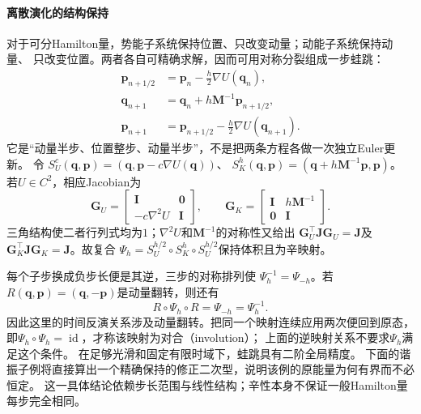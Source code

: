 \paragraph{离散演化的结构保持}
对于可分Hamilton量，势能子系统保持位置、只改变动量；动能子系统保持动量、
只改变位置。两者各自可精确求解，因而可用对称分裂组成一步蛙跳：
\begin{align}
  \bm p_{n+1/2}&=\bm p_n-\frac h2\nabla U(\bm q_n),
    \label{eq:dynamical-leapfrog-half-momentum}\\
  \bm q_{n+1}&=\bm q_n+h\bm M^{-1}\bm p_{n+1/2},
    \label{eq:dynamical-leapfrog-position}\\
  \bm p_{n+1}&=\bm p_{n+1/2}-\frac h2\nabla U(\bm q_{n+1}).
    \label{eq:dynamical-leapfrog-final-momentum}
\end{align}
它是“动量半步、位置整步、动量半步”，不是把两条方程各做一次独立Euler更新。
令
$S_U^c(\bm q,\bm p)=(\bm q,\bm p-c\nabla U(\bm q))$、
$S_K^h(\bm q,\bm p)=(\bm q+h\bm M^{-1}\bm p,\bm p)$。
若$U\in C^2$，相应Jacobian为
\[
  \bm G_U=\begin{bmatrix}\bm I&\bm0\\-c\nabla^2U&\bm I\end{bmatrix},
  \qquad
  \bm G_K=\begin{bmatrix}\bm I&h\bm M^{-1}\\\bm0&\bm I\end{bmatrix}.
\]
三角结构使二者行列式均为$1$；$\nabla^2U$和$\bm M^{-1}$的对称性又给出
$\bm G_U^\top\bm J\bm G_U=\bm J$及
$\bm G_K^\top\bm J\bm G_K=\bm J$。故复合
$\Psi_h=S_U^{h/2}\circ S_K^h\circ S_U^{h/2}$保持体积且为辛映射。

每个子步换成负步长便是其逆，三步的对称排列使
$\Psi_h^{-1}=\Psi_{-h}$。若$R(\bm q,\bm p)=(\bm q,-\bm p)$是动量翻转，则还有
\[
  R\circ\Psi_h\circ R=\Psi_{-h}=\Psi_h^{-1}.
\]
因此这里的时间反演关系涉及动量翻转。把同一个映射连续应用两次便回到原态，
即$\Psi_h\circ\Psi_h=\operatorname{id}$，才称该映射为对合（involution）；
上面的逆映射关系不要求$\Psi_h$满足这个条件。
在足够光滑和固定有限时域下，蛙跳具有二阶全局精度。
下面的谐振子例将直接算出一个精确保持的修正二次型，说明该例的原能量为何有界而不必恒定。
这一具体结论依赖步长范围与线性结构；辛性本身不保证一般Hamilton量每步完全相同。

